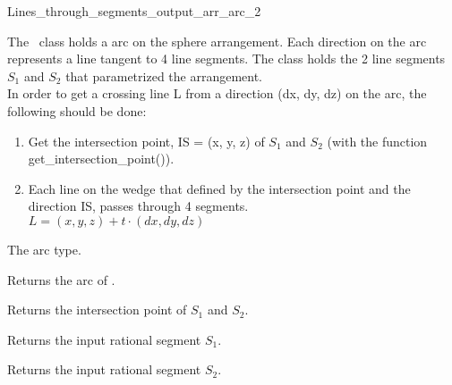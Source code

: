 \begin {ccRefClass} {Lines_through_segments_output_arr_arc_2}
    
\ccDefinition 

The \ccRefName\ class holds a arc on the sphere arrangement. Each direction on the arc represents a line tangent to 4 line segments. The class holds the 2 line segments $S_1$ and $S_2$ that parametrized the arrangement.\\
In order to get a crossing line L from a direction (dx, dy, dz) on the arc, the following should be done:

\begin{enumerate}
\item 
Get the intersection point, IS = (x, y, z) of $S_1$ and $S_2$ (with the function get\_intersection\_point()).
\item
Each line on the wedge that defined by the intersection point and the direction IS, passes through 4 segments.\\
$L = (x, y, z) + t \cdot (dx, dy, dz)$

\end{enumerate}

\ccTypes
{} {The arc type.}

\ccAccessFunctions
{}

         {Returns the arc of \ccVar{}.}

         {Returns the intersection point of $S_1$ and $S_2$.}

         {Returns the input rational segment $S_1$.}

         {Returns the input rational segment $S_2$.}

\ccSeeAlso
{}\\
\\
\\
\\
\\



\end{ccRefClass} 

